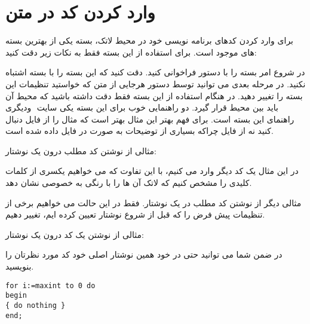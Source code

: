 \chapter{وارد کردن کد در متن}
برای وارد کردن کدهای برنامه نویسی خود در محیط لاتک، بسته  یکی از بهترین بسته های موجود است. برای استفاده از این بسته فقط به نکات زیر دقت کنید:
\begin{itemize}
\hand
در شروع امر بسته  را  با دستور  فراخوانی کنید. دقت کنید که این بسته را با بسته  اشتباه نکنید.
\hand
در مرحله بعدی می توانید توسط دستور  هرجایی از متن که خواستید تنظیمات این بسته را تغییر دهید. 
\hand
در هنگام استفاده از این بسته فقط دقت داشته باشید که محیط آن باید بین محیط ‌قرار گیرد. 
\hand
دو راهنمایی خوب برای این بسته یکی سایت ‌ ودیگری راهنمای این بسته است. 
\hand
برای فهم بهتر این مثال بهتر است که مثال را از فایل  دنبال کنید نه از فایل  چراکه بسیاری از توضیحات به صورت  در فایل  داده شده است. 
\end{itemize}


مثالی از نوشتن کد مطلب درون یک نوشتار:

\begin{latin}

\end{latin}

در این مثال یک کد  دیگر وارد می کنیم، با این تفاوت که می خواهیم یکسری از کلمات کلیدی را مشخص کنیم که لاتک آن ها را با رنگی به خصوصی نشان دهد. 
\begin{latin}

\end{latin}

مثالی دیگر از نوشتن کد مطلب در یک نوشتار. فقط در این حالت می خواهیم برخی از تنظیمات پیش فرض را که قبل از شروع نوشتار تعیین کرده ایم، تغییر دهیم. 
\begin{latin}

\end{latin}

مثالی از نوشتن یک کد {} درون یک نوشتار:

\begin{latin}

\end{latin}

در ضمن شما می توانید حتی در خود همین نوشتار اصلی خود کد مورد نظرتان را بنویسید. 
\begin{latin}
\begin{lstlisting}
for i:=maxint to 0 do
begin
{ do nothing }
end;
\end{lstlisting}
\end{latin}



